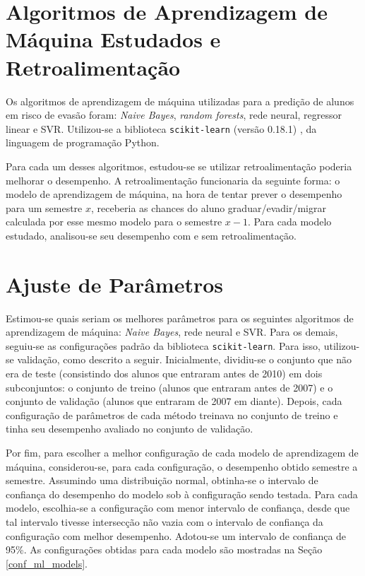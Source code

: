 \section{Algoritmos de Aprendizagem de Máquina Estudados e Retroalimentação} 
Os algoritmos de aprendizagem de máquina utilizadas para a predição de alunos em risco
de evasão foram: \textit{Naive Bayes}, \textit{random forests}, rede neural, regressor linear e
SVR. Utilizou-se a biblioteca \texttt{scikit-learn} (versão 0.18.1) \cite{sklearn}, da
linguagem de programação Python.
\par Para cada um desses algoritmos, estudou-se se
utilizar retroalimentação poderia melhorar o desempenho. A retroalimentação
funcionaria da seguinte forma: o modelo de aprendizagem de máquina, na hora de tentar
prever o desempenho para um semestre $x$, receberia as chances do aluno
graduar/evadir/migrar calculada por esse mesmo modelo para o semestre $x-1$.
Para cada modelo estudado, analisou-se seu desempenho com e sem
retroalimentação. 

\section{Ajuste de Parâmetros}\label{ajus_param}
Estimou-se quais seriam os melhores parâmetros para os seguintes algoritmos de
aprendizagem de máquina: \textit{Naive Bayes}, rede neural e SVR. Para os demais,
seguiu-se as configurações padrão da biblioteca \texttt{scikit-learn}.  
Para isso, utilizou-se validação, como descrito a seguir. Inicialmente, dividiu-se o
conjunto que não era de teste (consistindo dos alunos que entraram antes de 2010) em
dois subconjuntos: o conjunto de treino (alunos que entraram antes de 2007) e o
conjunto de validação (alunos que entraram de 2007 em diante). Depois, cada
configuração de parâmetros de cada método treinava no conjunto de treino e tinha seu
desempenho avaliado no conjunto de validação. 
\par Por fim, para escolher a melhor configuração de cada modelo de aprendizagem de
máquina, considerou-se, para cada configuração, o desempenho obtido semestre a
semestre.  Assumindo uma distribuição normal,
obtinha-se o intervalo de confiança do desempenho do modelo sob à configuração sendo
testada.  Para cada modelo, escolhia-se a configuração com menor intervalo de
confiança, desde que tal intervalo tivesse intersecção não vazia com o intervalo de
confiança da configuração com melhor desempenho. Adotou-se um intervalo de confiança
de 95\%.  As configurações obtidas para cada modelo são mostradas na Seção
\ref{conf_ml_models}.

